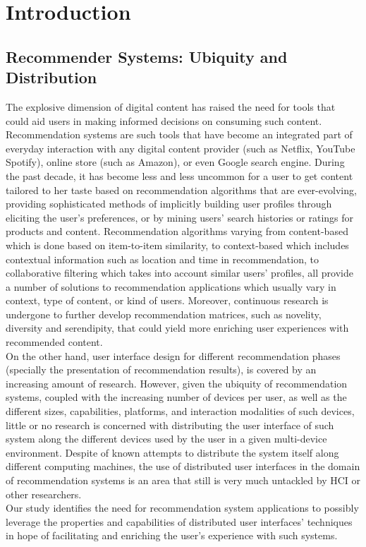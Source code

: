 \chapter{Introduction}\label{chapter:introduction}

\section{Recommender Systems: Ubiquity and Distribution}
The explosive dimension of digital content has raised the need for tools that
could aid users in making informed decisions on consuming such content.
Recommendation systems are such tools that have become an integrated part of
everyday interaction with any digital content provider (such as Netflix, YouTube
Spotify), online store (such as Amazon), or even Google search engine. During
the past decade, it has become less and less uncommon for a user to get content
tailored to her taste based on recommendation algorithms that are ever-evolving,
providing sophisticated methods of implicitly building user profiles
through eliciting the user's preferences, or by mining users' search histories
or ratings for products and content. Recommendation algorithms varying from
content-based which is done based on item-to-item similarity, to context-based
which includes contextual information such as location and time in
recommendation, to collaborative filtering which takes into account similar
users' profiles, all provide a number of solutions to recommendation
applications which usually vary in context, type of content, or kind of users.
Moreover, continuous research is undergone to further develop recommendation
matrices, such as novelity, diversity and serendipity, that could yield more enriching user experiences with recommended content.\\
On the other hand, user interface design for different recommendation phases
(specially the presentation of recommendation results), is covered by an
increasing amount of research. However, given the ubiquity of recommendation systems, coupled with the increasing number of devices per user, as well as the different sizes,
capabilities, platforms, and interaction modalities of such devices, little or
no research is concerned with distributing the user interface of such system
along the different devices used by the user in a given multi-device
environment. Despite of known attempts to distribute the system itself along
different computing machines, the use of distributed user interfaces in the
domain of recommendation systems is an area that still is very much untackled
by HCI or other researchers.\\
Our study identifies the need for recommendation system applications to possibly
leverage the properties and capabilities of distributed user interfaces'
techniques in hope of facilitating and enriching the user's experience with such systems.

